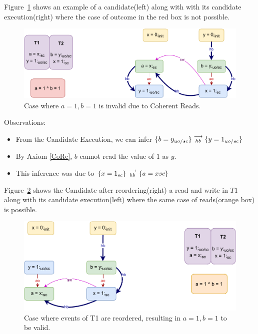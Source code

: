         Figure~\ref{reord_counter:example2(a)} shows an example of a candidate(left) along with with its candidate execution(right) where the case of outcome in the red box is not possible. 
        \begin{figure}[H]
            \centering
            \includegraphics[scale=0.7]{7.CounterExamples/ReorderingCandidate/Example3(Rsc-Wuo,sc).pdf}
            \caption{Case where $a = 1, b = 1$ is invalid due to Coherent Reads.}
            \label{reord_counter:example2(a)}
        \end{figure}

        Observations:
        \begin{itemize}
            \item From the Candidate Execution, we can infer $\{b=y_{uo/sc}\}\stackrel{\longrightarrow}{_{hb}}\{y=1_{uo/sc}\}$
            \item By Axiom \ref{CoRe}, $b$ cannot read the value of $1$ as $y$. 
            \item This inference was due to $\{x=1_{sc}\}\stackrel{\longrightarrow}{_{hb}}\{a=x{sc}\}$
        \end{itemize}

        Figure~\ref{reord_counter:example2(b)} shows the Candidate after reordering(right) a read and write in $T1$ along with its candidate execution(left) where the same case of reads(orange box) is possible. 
        \begin{figure}[H]
            \centering
            \includegraphics[scale=0.7]{7.CounterExamples/ReorderingCandidate/Example3R(Rsc-Wuo,sc).pdf}
            \caption{Case where events of T1 are reordered, resulting in $a = 1, b = 1$ to be valid.}
            \label{reord_counter:example2(b)}
        \end{figure}
        
